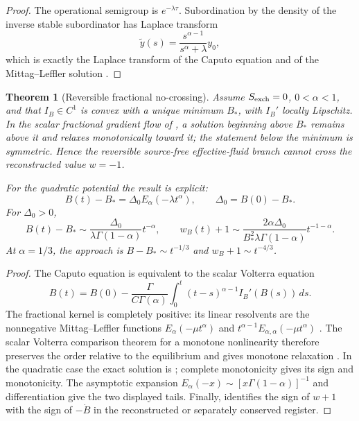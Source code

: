 \documentclass[11pt]{article}
\newtheorem{theorem}{Theorem}[section]
\theoremstyle{definition}
\theoremstyle{remark}
\begin{document}
\begin{proof}
The operational semigroup is \(e^{-\lambda\tau}\).  Subordination by the density
of the inverse stable subordinator has Laplace transform
\[
  \widetilde y(s)=\frac{s^{\alpha-1}}{s^\alpha+\lambda}y_0,
\]
which is exactly the Laplace transform of the Caputo equation and of the
Mittag--Leffler solution
\cite{MetzlerKlafter,MeerschaertScheffler,Podlubny}.
\end{proof}

\begin{theorem}[Reversible fractional no-crossing]
\label{thm:source-free-no-crossing}
Assume \(S_{\rm exch}=0\), \(0<\alpha<1\), and that \(I_B\in C^1\) is convex
with a unique minimum \(B_*\), with \(I_B'\) locally Lipschitz.  In the scalar
fractional gradient flow of
, a solution beginning above \(B_*\)
remains above it and relaxes monotonically toward it; the statement below the
minimum is symmetric.  Hence the reversible source-free effective-fluid branch
cannot cross the reconstructed value \(w=-1\).

For the quadratic potential the result is explicit:
\[
  B(t)-B_*=\Delta_0E_\alpha(-\lambda t^\alpha),
  \qquad \Delta_0=B(0)-B_*.
\]
For \(\Delta_0>0\),
\[
 B(t)-B_*\sim
 \frac{\Delta_0}{\lambda\Gamma(1-\alpha)}t^{-\alpha},
 \qquad
 w_B(t)+1\sim
 \frac{2\alpha\Delta_0}
 {B_*^2\lambda\Gamma(1-\alpha)}t^{-1-\alpha}.
\]
At \(\alpha=1/3\), the approach is \(B-B_*\sim t^{-1/3}\) and
\(w_B+1\sim t^{-4/3}\).
\end{theorem}

\begin{proof}
The Caputo equation is equivalent to the scalar Volterra equation
\[
 B(t)=B(0)-\frac{\Gamma}{C\Gamma(\alpha)}
 \int_0^t(t-s)^{\alpha-1}I_B'(B(s))\,ds.
\]
The fractional kernel is completely positive: its linear resolvents are the
nonnegative Mittag--Leffler functions
\(E_\alpha(-\mu t^\alpha)\) and
\(t^{\alpha-1}E_{\alpha,\alpha}(-\mu t^\alpha)\)
\cite{Pollard1948,Schneider1996}.  The scalar Volterra comparison theorem for a
monotone nonlinearity therefore preserves the order relative to the equilibrium
and gives monotone relaxation
\cite{GripenbergLondenStaffans}.  In the quadratic case the exact solution is
; complete monotonicity gives its sign and
monotonicity.  The asymptotic expansion
\(E_\alpha(-x)\sim[x\Gamma(1-\alpha)]^{-1}\) and differentiation give the two
displayed tails.  Finally,  identifies the
sign of \(w+1\) with the sign of \(-\dot B\) in the reconstructed or separately
conserved register.
\end{proof}
\end{document}
